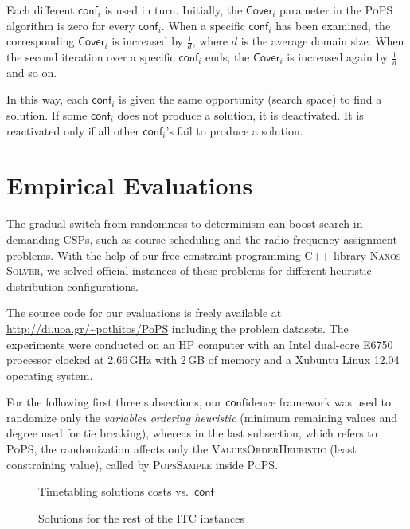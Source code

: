 \documentclass{ws-ijait}
\begin{document}
Each different $\mathsf{conf}_i$ is used in turn. Initially,
the $\mathsf{Cover}_i$ parameter in the \textsc{PoPS}
algorithm is zero for every $\mathsf{conf}_i$. When a
specific $\mathsf{conf}_i$ has been examined, the
corresponding $\mathsf{Cover}_i$ is increased by
$\frac{1}{d}$, where $d$ is the average domain size. When
the second iteration over a specific $\mathsf{conf}_i$ ends,
the $\mathsf{Cover}_i$ is increased again by $\frac{1}{d}$
and so on.

In this way, each $\mathsf{conf}_i$ is given the same
opportunity (search space) to find a solution. If some
$\mathsf{conf}_i$ does not produce a solution, it is
deactivated. It is reactivated only if all other
$\mathsf{conf}_i$'s fail to produce a solution.


\section{Empirical Evaluations}

The gradual switch from randomness to determinism can boost
search in demanding CSPs, such as course scheduling and the
radio frequency assignment problems. With the help of our
free constraint programming C++ library \textsc{Naxos
Solver},\cite{naxos-solver} we solved official instances of
these problems for different heuristic distribution
configurations.

The source code for our evaluations is freely available at
\url{http://di.uoa.gr/~pothitos/PoPS} including the problem
datasets. The experiments were conducted on an HP computer
with an Intel dual-core E6750 processor clocked at 2.66\,GHz
with 2\,GB of memory and a Xubuntu Linux 12.04 operating
system.

For the following first three subsections, our
$\mathsf{conf}$idence framework was used to randomize only
the \emph{variables ordering heuristic} (minimum remaining
values and degree used for tie breaking), whereas in the
last subsection, which refers to \textsc{PoPS}, the
randomization affects only the \textsc{ValuesOrderHeuristic}
(least constraining value), called by \textsc{PopsSample}
inside \textsc{PoPS}.

\begin{figure}
  \centering
  
  \caption{Timetabling solutions costs vs.\ 
           $\mathsf{conf}$\label{costsA}}
\end{figure}

\begin{figure}
  \centering
  
  \caption{Solutions for the rest of the ITC
           instances\label{costsB}}
\end{figure}
\end{document}
